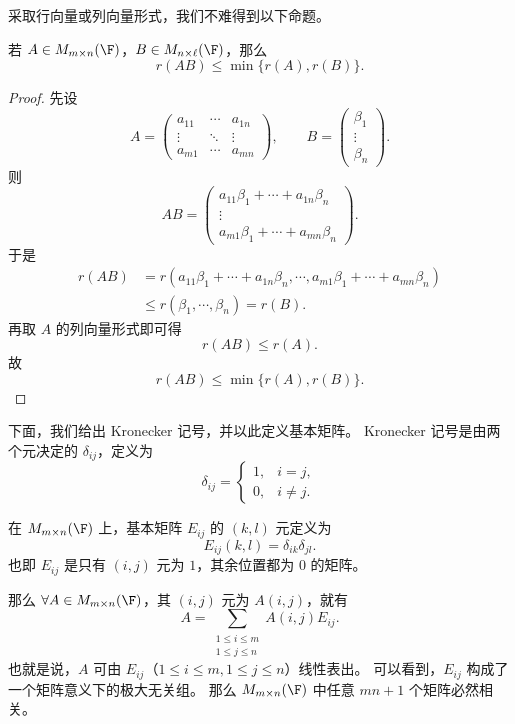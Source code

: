 采取行向量或列向量形式，我们不难得到以下命题。

\begin{proposition}
	若 $A\in M_{m\times n}(\F)$，$B\in M_{n\times \ell}(\F)$，那么
	\[
	r(AB)\leq \min\{r(A),r(B)\}.
	\]
\end{proposition}

\begin{proof}
	先设
	\[
	A=\begin{pmatrix}
		a_{11}&\cdots&a_{1n}\\
		\vdots&\ddots&\vdots\\
		a_{m1}&\cdots&a_{mn}
	\end{pmatrix},
	\qquad
	B=\begin{pmatrix}
		\beta_1\\ \vdots\\ \beta_n
	\end{pmatrix}.
	\]
	则
	\[
	AB=\begin{pmatrix}
		a_{11}\beta_1+\cdots+a_{1n}\beta_n\\
		\vdots\\
		a_{m1}\beta_1+\cdots+a_{mn}\beta_n
	\end{pmatrix}.
	\]
	于是
	\[
	\begin{aligned}
		r(AB)
		&=r(a_{11}\beta_1+
		\cdots+a_{1n}\beta_n,\cdots,
		a_{m1}\beta_1+
		\cdots+a_{mn}\beta_n)\\
		&\leq r(\beta_1,\cdots,\beta_n)=r(B).
	\end{aligned}
	\]
	再取 $A$ 的列向量形式即可得
	\[
	r(AB)\leq r(A).
	\]
	故
	\[
	r(AB)\leq \min\{r(A),r(B)\}.
	\]
\end{proof}

下面，我们给出 Kronecker 记号，并以此定义基本矩阵。
\label{p1:concept:c3-l652}Kronecker 记号是由两个元决定的 $\delta_{ij}$，定义为
\[
\delta_{ij}=\begin{cases}
	1,&i=j,\\
	0,&i\neq j.
\end{cases}
\]

\begin{definition}[基本矩阵]\label{p1:concept:c3-l660}
	在 $M_{m\times n}(\F)$ 上，基本矩阵 $E_{ij}$ 的 $(k,l)$ 元定义为
	\[
	E_{ij}(k,l)=\delta_{ik}\delta_{jl}.
	\]
	也即 $E_{ij}$ 是只有 $(i,j)$ 元为 $1$，其余位置都为 $0$ 的矩阵。
	

\end{definition}
	那么 $\forall A\in M_{m\times n}(\F)$，其 $(i,j)$ 元为 $A(i,j)$，就有
\[
A=\sum_{\substack{1\leq i\leq m\\1\leq j\leq n}} A(i,j)E_{ij}.\tag{1}
\]
也就是说，$A$ 可由 $E_{ij}$（$1\leq i\leq m,1\leq j\leq n$）线性表出。
可以看到，$E_{ij}$ 构成了一个矩阵意义下的极大无关组。
那么 $M_{m\times n}(\F)$ 中任意 $mn+1$ 个矩阵必然相关。


